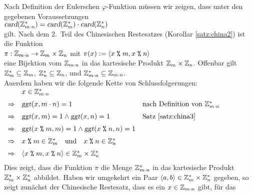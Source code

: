 \proof
Nach Definition der Eulerschen $\varphi$-Funktion m\"{u}ssen wir zeigen, dass unter den gegebenen
Voraussetzungen 
\\[0.2cm]
\hspace*{1.3cm}
$\textsl{card}(\mathbb{Z}_{m \cdot n}^*) = \textsl{card}(\mathbb{Z}_{m}^*) \cdot \textsl{card}(\mathbb{Z}_{n}^*)$
\\[0.2cm]
gilt.  Nach dem 2.~Teil des Chinesischen Restesatzes (Korollar \ref{satz:china2}) ist die Funktion
\\[0.2cm]
\hspace*{1.3cm}
$\pi : \mathbb{Z}_{m \cdot n} \rightarrow \mathbb{Z}_{m} \times \mathbb{Z}_{n}$ \quad mit
$\pi(x) := \langle x \;\texttt{\%}\; m, x \;\texttt{\%}\; n \rangle$
\\[0.2cm]
eine Bijektion vom $\mathbb{Z}_{m \cdot n}$ in das kartesische Produkt $\mathbb{Z}_{m} \times \mathbb{Z}_{n}$.  Offenbar gilt
\\[0.2cm]
\hspace*{1.3cm}
$\mathbb{Z}_{m}^* \subseteq \mathbb{Z}_{m}$, \quad
$\mathbb{Z}_{n}^* \subseteq \mathbb{Z}_{n}$, \quad und \quad
$\mathbb{Z}_{m \cdot n}^* \subseteq \mathbb{Z}_{m \cdot n}$.
\\[0.2cm]
Au\3erdem haben wir die folgende Kette von Schlussfolgerungen:
\\[0.2cm]
\hspace*{1.3cm}
$
\begin{array}[t]{lll}
            & x \in \mathbb{Z}_{m \cdot n}^*  \\[0.2cm]
\Rightarrow & \textsl{ggt}(x, m \cdot n) = 1 
            & \mbox{nach Definition von $\mathbb{Z}_{m \cdot n}^*$}                              \\[0.2cm]
\Rightarrow & \textsl{ggt}(x, m) = 1 \wedge \textsl{ggt}(x, n) = 1 
            & \mbox{Satz \ref{satz:china3}}                                             \\[0.2cm]
\Rightarrow & \textsl{ggt}(x \;\texttt{\%}\; m, m) = 1 \wedge \textsl{ggt}(x \;\texttt{\%}\; n, n) = 1 
              \\[0.2cm]
\Rightarrow & x \;\texttt{\%}\; m \in \mathbb{Z}_{m}^* \quad \mbox{und} \quad x \;\texttt{\%}\; n \in \mathbb{Z}_{n}^*  \\[0.2cm]
\Rightarrow & \langle x \;\texttt{\%}\; m, x \;\texttt{\%}\; n \rangle \in \mathbb{Z}_{m}^* \times \mathbb{Z}_{n}^*  \\[0.2cm]
\end{array}
$
\\[0.2cm]
Dies zeigt, dass die Funktion $\pi$ die Menge $\mathbb{Z}_{m \cdot n}^*$ in das kartesische Produkt
$\mathbb{Z}_{m}^* \times \mathbb{Z}_{n}^*$ abbildet.  Haben wir umgekehrt ein Paar $\langle a, b \rangle \in \mathbb{Z}_{m}^* \times \mathbb{Z}_{n}^*$ gegeben, 
so zeigt zun\"{a}chst der Chinesische Restesatz, dass es ein $x \in \mathbb{Z}_{m \cdot n}$ gibt, f\"{u}r das 
